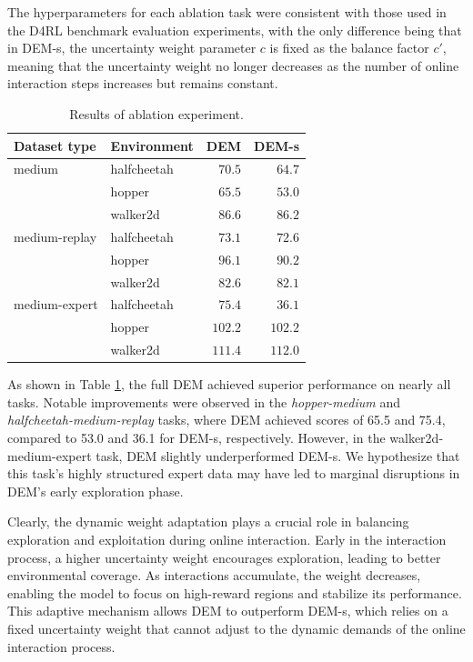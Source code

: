 \documentclass[conference]{IEEEtran}
\begin{document}
The hyperparameters for each ablation task were consistent with those used in the D4RL benchmark evaluation experiments, with the only difference being that in DEM-s, the uncertainty weight parameter $c$ is fixed as the balance factor $c'$, meaning that the uncertainty weight no longer decreases as the number of online interaction steps increases but remains constant.

\begin{table}
  \centering
  \begin{tabular}{llrr}
    \toprule
    \textbf{Dataset type} & \textbf{Environment} & \textbf{DEM} & \textbf{DEM-s} \\
    \midrule
    medium        & halfcheetah & $\mathbf{70.5}$ & $64.7$ \\
                  & hopper & $\mathbf{65.5}$ & $53.0$ \\
                  & walker2d & $\mathbf{86.6}$ & $86.2$  \\
    medium-replay & halfcheetah & $\mathbf{73.1}$ & $72.6$ \\
                  & hopper & $\mathbf{96.1}$ & $90.2$ \\
                  & walker2d & $\mathbf{82.6}$ & $82.1$ \\
    medium-expert & halfcheetah & $\mathbf{75.4}$ & $36.1$ \\
                  & hopper & $102.2$ & $102.2$ \\
                  & walker2d & $111.4$ & $\mathbf{112.0}$ \\
    \bottomrule
  \end{tabular}
  \caption{Results of ablation experiment.}
  \label{tab:ablation}
\end{table}

As shown in Table \ref{tab:ablation}, the full DEM achieved superior performance on nearly all tasks. Notable improvements were observed in the \textit{hopper-medium} and \textit{halfcheetah-medium-replay} tasks, where DEM achieved scores of 65.5 and 75.4, compared to 53.0 and 36.1 for DEM-s, respectively. However, in the walker2d-medium-expert task, DEM slightly underperformed DEM-s. We hypothesize that this task's highly structured expert data may have led to marginal disruptions in DEM's early exploration phase.

Clearly, the dynamic weight adaptation plays a crucial role in balancing exploration and exploitation during online interaction. Early in the interaction process, a higher uncertainty weight encourages exploration, leading to better environmental coverage. As interactions accumulate, the weight decreases, enabling the model to focus on high-reward regions and stabilize its performance. This adaptive mechanism allows DEM to outperform DEM-s, which relies on a fixed uncertainty weight that cannot adjust to the dynamic demands of the online interaction process.
\end{document}

